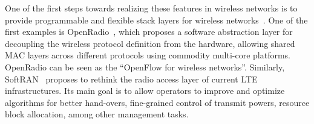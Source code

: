 
One of the first steps towards realizing these features in wireless networks is to provide programmable and 
flexible stack layers for wireless networks~\cite{bansal2012,gudipati2013}.
One of the first examples is OpenRadio~\cite{bansal2012}, which proposes a software 
abstraction layer for decoupling the wireless protocol definition from the hardware, allowing shared MAC 
layers across different protocols using commodity multi-core platforms. OpenRadio can be seen as the 
``OpenFlow for wireless networks''. Similarly, SoftRAN~\cite{gudipati2013} proposes to rethink 
the radio access layer of current LTE infrastructures. Its main goal is to allow operators to improve and 
optimize algorithms for better hand-overs, fine-grained control of transmit powers, resource block allocation, 
among other management tasks.

